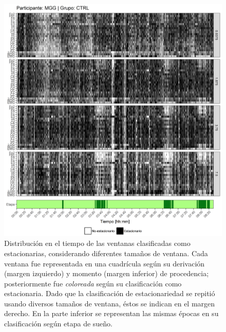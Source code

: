 \begin{figure}
\centering
\includegraphics[width=\linewidth]
{./scripts_graf_res/MGG_patrones_1.png}
\caption[Distribución en el tiempo de las ventanas clasificadas como estacionarias, considerando diferentes tamaños de ventana]{Distribución en el tiempo de las ventanas clasificadas como estacionarias, considerando diferentes tamaños de ventana. 
Cada ventana fue representada en una cuadrícula según su derivación (margen izquierdo) y momento (margen inferior) de procedencia; posteriormente fue \textit{coloreada} según su clasificación como estacionaria.
Dado que la clasificación de estacionariedad se repitió usando diversos tamaños de ventana, éstos se indican en el margen derecho.
En la parte inferior se representan las mismas épocas en su clasificación según etapa de sueño.}
\end{figure}
